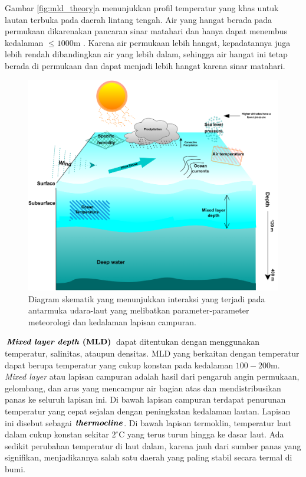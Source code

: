 \begin{spacing}{1.5}
	Gambar \ref{fig:mld_theory}a menunjukkan profil temperatur yang khas untuk lautan terbuka pada daerah lintang tengah. Air yang hangat berada pada permukaan dikarenakan pancaran sinar matahari dan hanya dapat menembus kedalaman $\leq 1000$m . Karena air permukaan lebih hangat, kepadatannya juga lebih rendah dibandingkan air yang lebih dalam, sehingga air hangat ini tetap berada di permukaan dan dapat menjadi lebih hangat karena sinar matahari. 
	\begin{figure}[H]
		\centering
		\includegraphics[width=15cm]{contents/MLD_Illustration}
		\caption{Diagram skematik yang menunjukkan interaksi yang terjadi pada antarmuka udara-laut yang melibatkan parameter-parameter meteorologi dan kedalaman lapisan campuran.}
		\label{fig:mld_illustration}
	\end{figure}
	$\textbf{\textit{Mixed layer depth} (MLD)}$ dapat ditentukan dengan menggunakan temperatur, salinitas, ataupun densitas. MLD yang berkaitan dengan temperatur dapat berupa temperatur yang cukup konstan pada kedalaman $100 - 200$m. \textit{Mixed layer} atau lapisan campuran adalah hasil dari pengaruh angin permukaan, gelombang, dan arus yang mencampur air bagian atas dan mendistribusikan panas ke seluruh lapisan ini. Di bawah lapisan campuran terdapat penurunan temperatur yang cepat sejalan dengan peningkatan kedalaman lautan. Lapisan ini disebut sebagai $\textbf{\textit{thermocline}}$. Di bawah lapisan termoklin, temperatur laut dalam cukup konstan sekitar $2^\circ$C yang terus turun hingga ke dasar laut. Ada sedikit perubahan temperatur di laut dalam, karena jauh dari sumber panas yang signifikan, menjadikannya salah satu daerah yang paling stabil secara termal di bumi.

\end{spacing}
